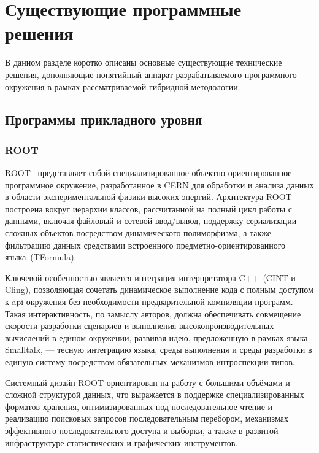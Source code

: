 \section{Существующие программные решения}

В данном разделе коротко описаны основные существующие
технические решения, дополняющие понятийный аппарат разрабатываемого
программного окружения в рамках рассматриваемой гибридной методологии.

\subsection{Программы прикладного уровня}

\subsubsection{ROOT}

ROOT~\cite{ROOT-framework} представляет собой специализированное
объектно-ориентированное программное окружение, разработанное в CERN
для обработки и анализа данных в области экспериментальной физики
высоких энергий. Архитектура ROOT построена вокруг иерархии классов,
рассчитанной на полный цикл работы с данными, включая файловый и
сетевой ввод/вывод, поддержку сериализации сложных объектов
посредством динамического полиморфизма, а также фильтрацию данных
средствами встроенного предметно-ориентированного языка~(TFormula).

Ключевой особенностью является интеграция интерпретатора C++~(CINT и Cling),
позволяющая сочетать динамическое выполнение кода с полным доступом
к \acrshort{api} окружения без необходимости предварительной компиляции
программ. Такая интерактивность, по замыслу авторов, должна обеспечивать
совмещение скорости разработки сценариев и выполнения высокопроизводительных
вычислений в едином окружении, развивая идею, предложенную в
рамках языка Smalltalk, — тесную интеграцию языка, среды
выполнения и среды разработки в единую систему посредством
обязательных механизмов интроспекции типов.

Системный дизайн ROOT ориентирован на работу с большими
объёмами и сложной структурой данных, что выражается в
поддержке специализированных форматов хранения, оптимизированных
под последовательное чтение и реализацию поисковых запросов
последовательным перебором, механизмах
эффективного последовательного доступа и выборки, а также в
развитой инфраструктуре статистических и графических инструментов.

